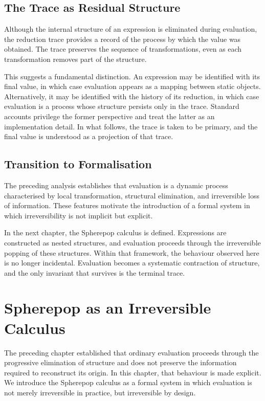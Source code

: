 \documentclass[12pt, oneside]{amsbook}
\theoremstyle{plain}
\theoremstyle{definition}
\theoremstyle{remark}
\begin{document}
\section{The Trace as Residual Structure}
\label{sec:visible:trace}

Although the internal structure of an expression is eliminated during
evaluation, the reduction trace provides a record of the process by which the
value was obtained. The trace preserves the sequence of transformations, even
as each transformation removes part of the structure.

This suggests a fundamental distinction. An expression may be identified with
its final value, in which case evaluation appears as a mapping between static
objects. Alternatively, it may be identified with the history of its reduction,
in which case evaluation is a process whose structure persists only in the
trace. Standard accounts privilege the former perspective and treat the latter
as an implementation detail. In what follows, the trace is taken to be primary,
and the final value is understood as a projection of that trace.

\section{Transition to Formalisation}
\label{sec:visible:transition}

The preceding analysis establishes that evaluation is a dynamic process
characterised by local transformation, structural elimination, and irreversible
loss of information. These features motivate the introduction of a formal
system in which irreversibility is not implicit but explicit.

In the next chapter, the Spherepop calculus is defined. Expressions are
constructed as nested structures, and evaluation proceeds through the
irreversible popping of these structures. Within that framework, the behaviour
observed here is no longer incidental. Evaluation becomes a systematic
contraction of structure, and the only invariant that survives is the terminal
trace.

\chapter{Spherepop as an Irreversible Calculus}
\label{ch:spherepop}

The preceding chapter established that ordinary evaluation proceeds through the
progressive elimination of structure and does not preserve the information
required to reconstruct its origin. In this chapter, that behaviour is made
explicit. We introduce the Spherepop calculus as a formal system in which
evaluation is not merely irreversible in practice, but irreversible by design.
\end{document}
